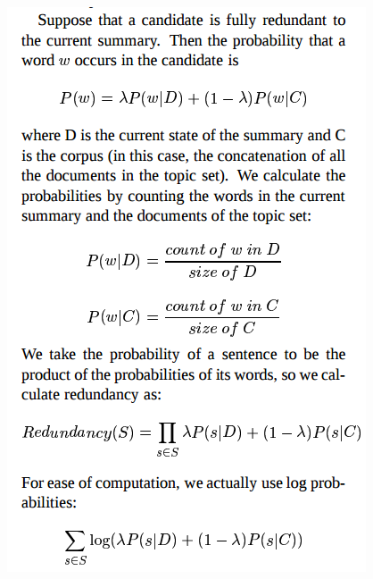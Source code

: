 \documentclass[xcolor={table}]{beamer}
\begin{document}
\begin{frame}[t]{\cite{zajic2006sentence}}
      \begin{figure}[h]
          \centering
      \includegraphics[scale=.25]{images/red-zajic06.png} \\
  \end{figure}
\end{frame}
\end{document}
